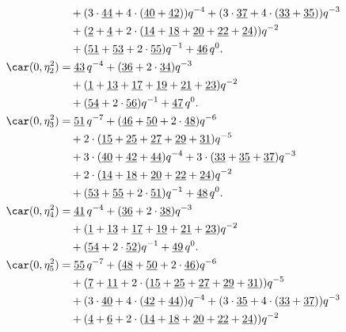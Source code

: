 \begin{align*}
	&\quad+(3\cdot\underline{44}+4\cdot(\underline{40}+\underline{42}))q^{-4}+(3\cdot\underline{37}+4\cdot(\underline{33}+\underline{35}))q^{-3}\\
	&\quad+(\underline{2}+\underline{4}+2\cdot(\underline{14}+\underline{18}+\underline{20}+\underline{22}+\underline{24}))q^{-2}\\
	&\quad+(\underline{51}+\underline{53}+2\cdot\underline{55})q^{-1}+\underline{46}\,q^0.\\
	\car(0,\eta^{2}_{2})
	&=\underline{43}\,q^{-4}+(\underline{36}+2\cdot\underline{34})q^{-3}\\
	&\quad+(\underline{1}+\underline{13}+\underline{17}+\underline{19}+\underline{21}+\underline{23})q^{-2}\\
	&\quad+(\underline{54}+2\cdot\underline{56})q^{-1}+\underline{47}\,q^0.\\
	\car(0,\eta^{2}_{3})
	&=\underline{51}\,q^{-7}+(\underline{46}+\underline{50}+2\cdot\underline{48})q^{-6}\\
	&\quad+2\cdot(\underline{15}+\underline{25}+\underline{27}+\underline{29}+\underline{31})q^{-5}\\
	&\quad+3\cdot(\underline{40}+\underline{42}+\underline{44})q^{-4}+3\cdot(\underline{33}+\underline{35}+\underline{37})q^{-3}\\
	&\quad+2\cdot(\underline{14}+\underline{18}+\underline{20}+\underline{22}+\underline{24})q^{-2}\\
	&\quad+(\underline{53}+\underline{55}+2\cdot\underline{51})q^{-1}+\underline{48}\,q^0.\\
	\car(0,\eta^{2}_{4})
	&=\underline{41}\,q^{-4}+(\underline{36}+2\cdot\underline{38})q^{-3}\\
	&\quad+(\underline{1}+\underline{13}+\underline{17}+\underline{19}+\underline{21}+\underline{23})q^{-2}\\
	&\quad+(\underline{54}+2\cdot\underline{52})q^{-1}+\underline{49}\,q^0.\\
	\car(0,\eta^{2}_{5})
	&=\underline{55}\,q^{-7}+(\underline{48}+\underline{50}+2\cdot\underline{46})q^{-6}\\
	&\quad+(\underline{7}+\underline{11}+2\cdot(\underline{15}+\underline{25}+\underline{27}+\underline{29}+\underline{31}))q^{-5}\\
	&\quad+(3\cdot\underline{40}+4\cdot(\underline{42}+\underline{44}))q^{-4}+(3\cdot\underline{35}+4\cdot(\underline{33}+\underline{37}))q^{-3}\\
	&\quad+(\underline{4}+\underline{6}+2\cdot(\underline{14}+\underline{18}+\underline{20}+\underline{22}+\underline{24}))q^{-2}\\

\end{align*}
